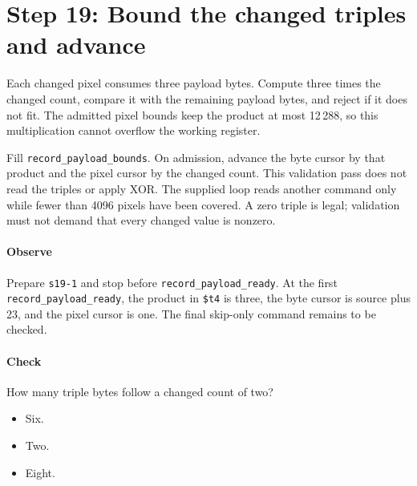 \section{Step 19: Bound the changed triples and advance}
Each changed pixel consumes three payload bytes. Compute three times the
changed count, compare it with the remaining payload bytes, and reject if it
does not fit. The admitted pixel bounds keep the product at most 12\,288, so
this multiplication cannot overflow the working register.

Fill \texttt{record\_payload\_bounds}. On admission, advance the byte cursor
by that product and the pixel cursor by the changed count. This validation pass
does not read the triples or apply XOR. The supplied loop reads another command
only while fewer than 4096 pixels have been covered. A zero triple is legal;
validation must not demand that every changed value is nonzero.

\paragraph{Observe} Prepare \texttt{s19-1} and stop before
\texttt{record\_payload\_ready}. At the first \texttt{record\_payload\_ready}, the product in
\texttt{\$t4} is three, the byte cursor is source plus 23, and the pixel
cursor is one. The final skip-only command remains to be checked.

\paragraph{Check} How many triple bytes follow a changed count of two?
\begin{itemize}
  \item[A.] Six.
  \item[B.] Two.
  \item[C.] Eight.
\end{itemize}
